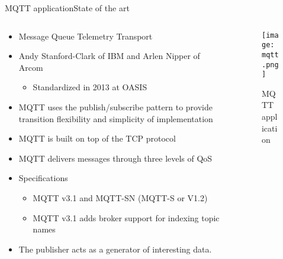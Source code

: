 \begin{frame}{MQTT application}{State of the art}
	\begin{columns}
		
		\begin{column}{0.6\textwidth}
			\begin{itemize}
				\item Message Queue Telemetry Transport
				\item Andy Stanford-Clark of IBM and Arlen Nipper of Arcom
					\begin{itemize}
						\item Standardized in 2013 at OASIS
					\end{itemize}
				\item MQTT uses the publish/subscribe pattern to provide transition flexibility and simplicity of implementation
				\item MQTT is built on top of the TCP protocol
				\item MQTT delivers messages through three levels of QoS
				\item Specifications
					\begin{itemize}
						\item MQTT v3.1 and MQTT-SN (MQTT-S or V1.2)
						\item MQTT v3.1 adds broker support for indexing topic names
					\end{itemize}
				\item The publisher acts as a generator of interesting data.
			\end{itemize}
			
		\end{column}
		
		\begin{column}{0.4\textwidth}
			\begin{center}
			
				\begin{figure}
					\texttt{[image: mqtt.png]}
					\caption{\label{fig:mqtt} MQTT application}
				\end{figure}
				
			\end{center}
		\end{column}
		
	\end{columns}
	
\end{frame}

